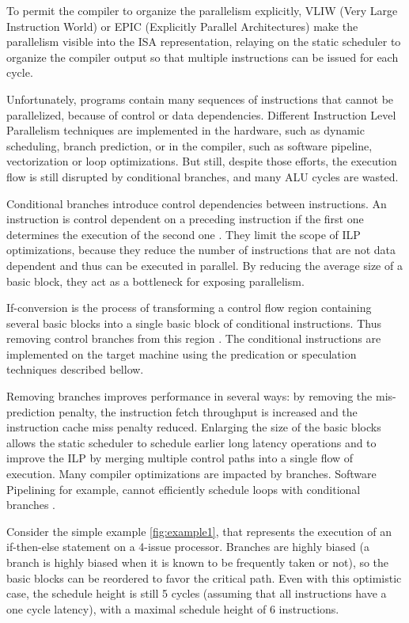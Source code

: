 To permit the compiler to organize the parallelism explicitly, VLIW (Very Large Instruction World) or EPIC (Explicitly Parallel Architectures) make the parallelism visible into the ISA representation, relaying on the static scheduler to organize the compiler output so that multiple instructions can be issued for each cycle. 

Unfortunately, programs contain many sequences of instructions that cannot be parallelized, because of control or data dependencies. Different Instruction Level Parallelism techniques are implemented in the hardware, such as dynamic scheduling, branch prediction, or in the compiler, such as software pipeline, vectorization or loop optimizations. But still, despite those efforts, the execution flow is still disrupted by conditional branches, and many ALU cycles are wasted. 

Conditional branches introduce control dependencies between instructions. An instruction is control dependent on a preceding instruction if the first one determines the execution of the second one \cite{Kennedy:2001:OCM:502981}. They limit the scope of ILP optimizations, because they reduce the number of instructions that are not data dependent and thus can be executed in parallel. By reducing the average size of a basic block, they act as a bottleneck for exposing parallelism.

If-conversion is the process of transforming a control flow region containing several basic blocks into a single basic block of conditional instructions. Thus removing control branches from this region \cite{Schlansker97achievinghigh}. The conditional instructions are implemented on the target machine using the predication or speculation techniques described bellow.

Removing branches improves performance in several ways: by removing the mis-prediction penalty, the instruction fetch throughput is increased and the instruction cache miss penalty reduced. Enlarging the size of the basic blocks allows the static scheduler to schedule earlier long latency operations and to improve the ILP by merging multiple control paths into a single flow of execution. Many compiler optimizations are impacted by branches. Software Pipelining for example, cannot efficiently schedule loops with conditional branches \cite{Warter:1992:EMS:144953.145796}.

Consider the simple example \ref{fig:example1}, that represents the execution of an if-then-else statement on a 4-issue processor. Branches are highly biased (a branch is highly biased when it is known to be frequently taken or not), so the basic blocks can be reordered to favor the critical path. Even with this optimistic case, the schedule height is still 5 cycles (assuming that all instructions have a one cycle latency), with a maximal schedule height of 6 instructions. 

